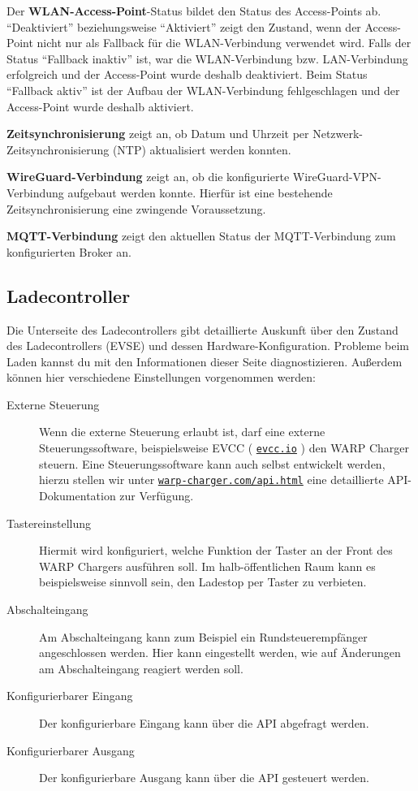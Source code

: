 \documentclass[a4paper,10pt]{article}
\newcommand\rurl[2]{%
  \href{#1}{\nolinkurl{#2}}%
}
\begin{document}
\begin{multicols*}{2}
	Der \textbf{WLAN-Access-Point}-Status bildet den Status des Access-Points ab.
	\enquote{Deaktiviert} beziehungsweise \enquote{Aktiviert} zeigt den Zustand, wenn der Access-Point nicht
	nur als Fallback für die WLAN-Verbindung verwendet wird. Falls der Status \enquote{Fallback inaktiv} ist,
	war die WLAN-Verbindung bzw. LAN-Verbindung erfolgreich und der Access-Point wurde deshalb deaktiviert.
	Beim Status \enquote{Fallback aktiv} ist der Aufbau der WLAN-Verbindung fehlgeschlagen und der
	Access-Point wurde deshalb aktiviert.

	\textbf{Zeitsynchronisierung} zeigt an, ob Datum und Uhrzeit per Netzwerk-Zeitsynchronisierung (NTP) aktualisiert werden konnten.

	\textbf{WireGuard-Verbindung} zeigt an, ob die konfigurierte WireGuard-VPN-Verbindung aufgebaut werden konnte. Hierfür ist eine bestehende Zeitsynchronisierung eine zwingende Voraussetzung.

	\textbf{MQTT-Verbindung} zeigt den aktuellen Status der MQTT-Verbindung
	zum konfigurierten Broker an.

	\subsection{Ladecontroller}\label{evse}
	Die Unterseite des Ladecontrollers gibt detaillierte Auskunft über den Zustand
	des Ladecontrollers (EVSE) und dessen Hardware-Konfiguration. Probleme beim Laden
	kannst du mit den Informationen dieser Seite diagnostizieren. Außerdem können hier verschiedene
	Einstellungen vorgenommen werden:
	\begin{description}
	 \item[Externe Steuerung] Wenn die externe Steuerung erlaubt ist, darf eine externe Steuerungssoftware, beispielsweise
	 EVCC (\rurl{https://evcc.io}{evcc.io}) den WARP Charger steuern. Eine Steuerungssoftware kann auch selbst entwickelt werden, hierzu stellen
	 wir unter \rurl{https://warp-charger.com/api.html}{warp-charger.com/api.html} eine detaillierte API-Dokumentation zur Verfügung.
	 \item[Tastereinstellung] Hiermit wird konfiguriert, welche Funktion der Taster an der Front
	 des WARP Chargers ausführen soll. Im halb-öffentlichen Raum kann es beispielsweise sinnvoll sein,
	 den Ladestop per Taster zu verbieten.
	 \item[Abschalteingang] Am Abschalteingang kann zum Beispiel ein Rundsteuerempfänger angeschlossen werden.
	 Hier kann eingestellt werden, wie auf Änderungen am Abschalteingang reagiert werden soll.
	 \item[Konfigurierbarer Eingang] Der konfigurierbare Eingang kann über die API abgefragt werden.
	 \item[Konfigurierbarer Ausgang] Der konfigurierbare Ausgang kann über die API gesteuert werden.
	\end{description}


\end{multicols*}
\end{document}
